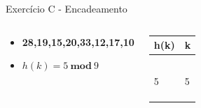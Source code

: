 \documentclass{beamer}
\begin{document}
\begin{frame}{Exercício C - Encadeamento}
\begin{columns}
        \footnotesize         
        \begin{block}{}
 		 \begin{itemize}
 		  \item \textbf{28,19,15,20,33,12,17,10}
 		  \item $h(k) = 5 \ \mathbf{mod} \ 9$  
 		 \end{itemize}

 		  \end{block} 
    
        \begin{table}[]
        \centering
        \footnotesize
        \begin{tabular}{|l|l|}
        \hline
        h(k) & k \\ \hline
            &   \\ \hline
            &   \\ \hline
            &   \\ \hline
            &   \\ \hline
            &   \\ \hline
        5   & 5   \\ \hline
            &   \\ \hline
            &   \\ \hline
            &   \\ \hline
        \end{tabular}%

        \end{table}       
        \end{columns}
\end{frame}
\end{document}
